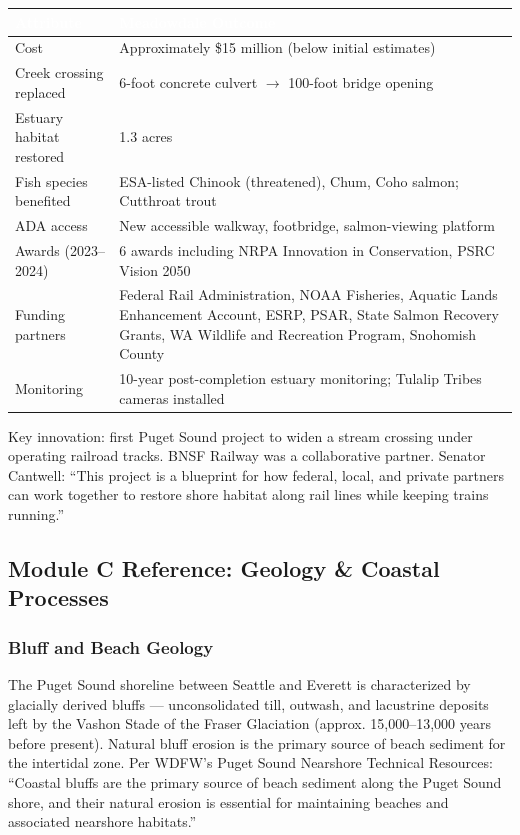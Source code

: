 \documentclass[11pt,letterpaper]{article}
\newcommand{\tableheader}[1]{\textbf{\sffamily\textcolor{white}{#1}}}
\begin{document}
\begin{center}
\begin{tabularx}{\textwidth}{L{4.5cm}X}
\toprule
{}
\tableheader{Attribute} & \tableheader{Meadowdale Outcome} \\
\midrule
Cost & Approximately \$15 million (below initial estimates) \\
Creek crossing replaced & 6-foot concrete culvert $\rightarrow$ 100-foot bridge opening \\
Estuary habitat restored & 1.3 acres \\
Fish species benefited & ESA-listed Chinook (threatened), Chum, Coho salmon; Cutthroat trout \\
ADA access & New accessible walkway, footbridge, salmon-viewing platform \\
Awards (2023--2024) & 6 awards including NRPA Innovation in Conservation, PSRC Vision 2050 \\
Funding partners & Federal Rail Administration, NOAA Fisheries, Aquatic Lands Enhancement Account, ESRP, PSAR, State Salmon Recovery Grants, WA Wildlife and Recreation Program, Snohomish County \\
Monitoring & 10-year post-completion estuary monitoring; Tulalip Tribes cameras installed \\
\bottomrule
\end{tabularx}
\end{center}

Key innovation: first Puget Sound project to widen a stream crossing under operating railroad tracks. BNSF Railway was a collaborative partner. Senator Cantwell: ``This project is a blueprint for how federal, local, and private partners can work together to restore shore habitat along rail lines while keeping trains running.''

\subsection{Module C Reference: Geology \& Coastal Processes}

\subsubsection{Bluff and Beach Geology}

The Puget Sound shoreline between Seattle and Everett is characterized by glacially derived bluffs --- unconsolidated till, outwash, and lacustrine deposits left by the Vashon Stade of the Fraser Glaciation (approx. 15,000--13,000 years before present). Natural bluff erosion is the primary source of beach sediment for the intertidal zone. Per WDFW's Puget Sound Nearshore Technical Resources: ``Coastal bluffs are the primary source of beach sediment along the Puget Sound shore, and their natural erosion is essential for maintaining beaches and associated nearshore habitats.''
\end{document}
